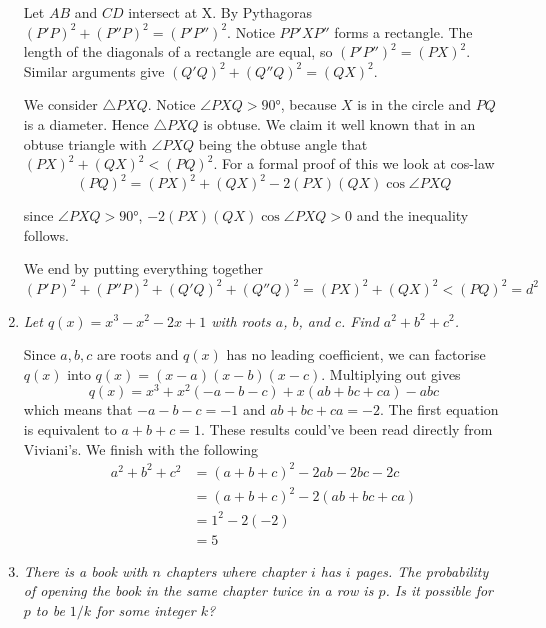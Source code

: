 \documentclass{article}
\begin{document}
\begin{enumerate}[1.]
Let $AB$ and $CD$ intersect at X. By Pythagoras $(P'P)^2 + (P''P)^2 = (P'P'')^2$. Notice $PP'XP''$ forms a rectangle. The length of the diagonals of a rectangle are equal, so $(P'P'')^2 = (PX)^2$. Similar arguments give $(Q'Q)^2 + (Q''Q)^2 = (QX)^2$.

We consider $\triangle PXQ$. Notice $\angle PXQ > 90$°, because $X$ is in the circle and $PQ$ is a diameter. Hence $\triangle PXQ$ is obtuse. We claim it well known that in an obtuse triangle with $\angle PXQ$ being the obtuse angle that $(PX)^2 + (QX)^2 < (PQ)^2$. For a formal proof of this we look at cos-law $$(PQ)^2 = (PX)^2 + (QX)^2 - 2(PX)(QX)\cos \angle PXQ$$ 

since $\angle PXQ > 90$°, $-2(PX)(QX)\cos \angle PXQ > 0$ and the inequality follows.

We end by putting everything together $$(P'P)^2+(P''P)^2+(Q'Q)^2+(Q''Q)^2 = (PX)^2 + (QX)^2 < (PQ)^2 = d^2$$ 

\item %
{\itshape Let $q(x) = x^3 -x^2 -2x +1$ with roots $a$, $b$, and $c$.
Find $a^2 +b^2 + c^2$.}

Since $a,b,c$ are roots and $q(x)$ has no leading coefficient, we can factorise $q(x)$ into $q(x) = (x - a)(x - b)(x - c)$. Multiplying out gives $$q(x) = x^3 + x^2(-a - b - c) + x(ab + bc + ca) - abc$$ which means that $-a -b -c = -1$ and $ab + bc + ca = -2$. The first equation is equivalent to $a + b + c = 1$. These results could've been read directly from Viviani's. We finish with the following
\begin{align*}
a^2 + b^2 + c^2 &= (a + b + c)^2 - 2ab -2bc -2c\\
&= (a + b + c)^2 - 2(ab + bc + ca)\\
&= 1^2 -2(-2)\\
&= 5
\end{align*}


\item %
{\itshape There is a book with $n$ chapters where chapter $i$ has $i$ pages.
The probability of opening the book in the same chapter twice in a row is $p$.
Is it possible for $p$ to be $1/k$ for some integer $k$?}


\end{enumerate}
\end{document}
